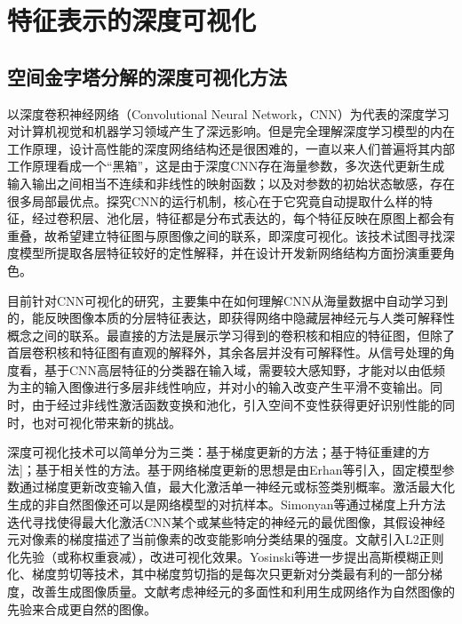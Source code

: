 \chapter{特征表示的深度可视化}
\label{chap:visualization}

\section{空间金字塔分解的深度可视化方法}
以深度卷积神经网络（Convolutional Neural Network，CNN）为代表的深度学习对计算机视觉和机器学习领域产生了深远影响。但是完全理解深度学习模型的内在工作原理，设计高性能的深度网络结构还是很困难的，一直以来人们普遍将其内部工作原理看成一个“黑箱”，这是由于深度CNN存在海量参数，多次迭代更新生成输入输出之间相当不连续和非线性的映射函数；以及对参数的初始状态敏感，存在很多局部最优点。探究CNN的运行机制，核心在于它究竟自动提取什么样的特征，经过卷积层、池化层，特征都是分布式表达的，每个特征反映在原图上都会有重叠，故希望建立特征图与原图像之间的联系，即深度可视化。该技术试图寻找深度模型所提取各层特征较好的定性解释，并在设计开发新网络结构方面扮演重要角色。


目前针对CNN可视化的研究，主要集中在如何理解CNN从海量数据中自动学习到的，能反映图像本质的分层特征表达，即获得网络中隐藏层神经元与人类可解释性概念之间的联系。最直接的方法是展示学习得到的卷积核和相应的特征图，但除了首层卷积核和特征图有直观的解释外，其余各层并没有可解释性。从信号处理的角度看，基于CNN高层特征的分类器在输入域，需要较大感知野，才能对以由低频为主的输入图像进行多层非线性响应，并对小的输入改变产生平滑不变输出。同时，由于经过非线性激活函数变换和池化，引入空间不变性获得更好识别性能的同时，也对可视化带来新的挑战。


深度可视化技术可以简单分为三类：基于梯度更新的方法\citep{Erhan2009,simonyan14deep,Lenc2015,Szegedy2013a,JasonYosinski2015,Nguyen2016a,Nguyen2016b}；基于特征重建的方法\citep{Zeiler2014,Brox,Mahendran2015d,Mahendran2015}]；基于相关性的方法\citep{Cao2015,Bach2016}。基于网络梯度更新的思想是由Erhan等\citep{Erhan2009}引入，固定模型参数通过梯度更新改变输入值，最大化激活单一神经元或标签类别概率。激活最大化生成的非自然图像还可以是网络模型的对抗样本\citep{Goodfellow2014}。Simonyan等\citep{simonyan14deep,Lenc2015,Szegedy2013a}通过梯度上升方法迭代寻找使得最大化激活CNN某个或某些特定的神经元的最优图像，其假设神经元对像素的梯度描述了当前像素的改变能影响分类结果的强度。文献引入L2正则化先验（或称权重衰减），改进可视化效果。Yosinski等\citep{JasonYosinski2015}进一步提出高斯模糊正则化、梯度剪切等技术，其中梯度剪切指的是每次只更新对分类最有利的一部分梯度，改善生成图像质量。文献考虑神经元的多面性和利用生成网络作为自然图像的先验来合成更自然的图像。

